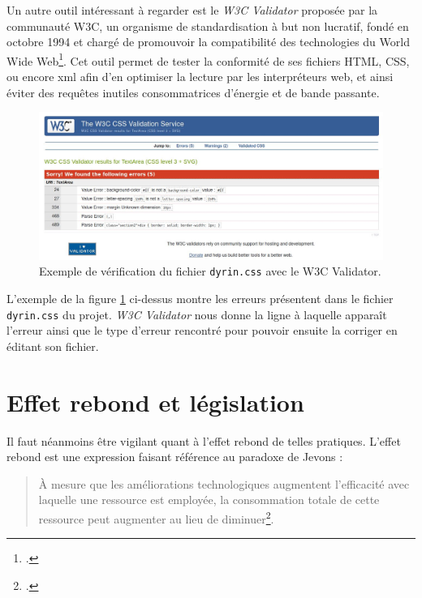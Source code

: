 \documentclass[a4paper,12pt,twoside]{book}
\begin{document}
Un autre outil intéressant à regarder est le \textit{W3C Validator} proposée par la communauté W3C, un organisme de standardisation à but non lucratif, fondé en octobre 1994 et chargé de promouvoir la compatibilité des technologies du World Wide Web\footcite{w3c}. Cet outil permet de tester la conformité de ses fichiers \acrshort{HTML}, \acrshort{CSS}, ou encore xml afin d'en optimiser la lecture par les interpréteurs web, et ainsi éviter des requêtes inutiles consommatrices d'énergie et de bande passante.

\begin{figure}[H]
    \centering
    \includegraphics[width=1\linewidth]{img/partie_3/css_validator.JPG}
    \caption{Exemple de vérification du fichier \texttt{dyrin.css} avec le W3C Validator.}
    \label{validator}
\end{figure}

L'exemple de la figure \ref{validator} ci-dessus montre les erreurs présentent dans le fichier \texttt{dyrin.css} du projet. \textit{W3C Validator} nous donne la ligne à laquelle apparaît l'erreur ainsi que le type d'erreur rencontré pour pouvoir ensuite la corriger en éditant son fichier.
\section{Effet rebond et législation}

Il faut néanmoins être vigilant quant à l'effet rebond de telles pratiques. L'effet rebond est une expression faisant référence au paradoxe de Jevons :
\begin{quote}
    À mesure que les améliorations technologiques augmentent l'efficacité avec laquelle une ressource est employée, la consommation totale de cette ressource peut augmenter au lieu de diminuer\footcite{jacoby_fuel-efficiency_2009}.
\end{quote}
\end{document}
